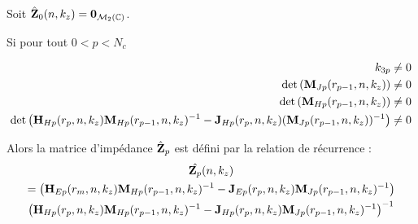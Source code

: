     \begin{thm}
      Soit \(\hat {\mathbf{Z}}_0(n,k_z) = \mathbf{0}_{\mathcal{M}_2(\mathbb C)}\).

      Si pour tout \(0 < p < N_c\)

      \begin{equation}
        \begin{aligned}
          k_{3p} & \not = 0 \\
          \det\left(\mathbf{M}_{Jp}(r_{p-1},n,k_z)\right) & \not = 0
          \\
          \det\left(\mathbf{M}_{Hp}(r_{p-1},n,k_z)\right) & \not = 0
          \\
          \det\left(\mathbf{H}_{Hp}(r_{p},n,k_z)\mathbf{M}_{Hp}(r_{p-1},n,k_z)^{-1} - \mathbf{J}_{Hp}(r_{p},n,k_z)(\mathbf{M}_{Jp}(r_{p-1},n,k_z))^{-1}\right) &\not = 0
        \end{aligned}
      \end{equation}

      Alors la matrice d'impédance \(\hat{\mathbf{Z}}_p\) est défini par la relation de récurrence :
      \begin{multline}
        \hat{\mathbf{Z}_p}(n,k_z) \\
          = \left(\mathbf{H}_{Ep}(r_m,n,k_z)\mathbf{M}_{Hp}(r_{p-1},n,k_z)^{-1} - \mathbf{J}_{Ep}(r_p,n,k_z)\mathbf{M}_{Jp}(r_{p-1},n,k_z)^{-1}\right) 
          \\
          \left(\mathbf{H}_{Hp}(r_p,n,k_z)\mathbf{M}_{Hp}(r_{p-1},n,k_z)^{-1} - \mathbf{J}_{Hp}(r_p,n,k_z)\mathbf{M}_{Jp}(r_{p-1},n,k_z)^{-1}\right)^{-1}
      \end{multline}
    \end{thm}

